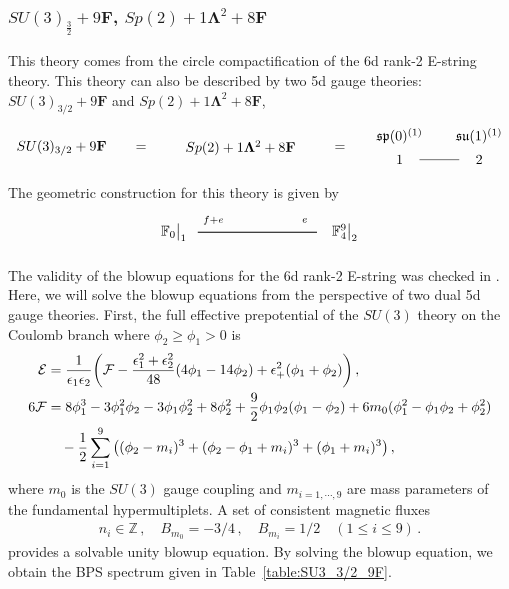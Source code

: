 \subsubsection{\texorpdfstring{$SU(3)_{\frac32}+9\mathbf{F}$,  $Sp(2)+1\mathbf{\Lambda}^2+8\mathbf{F}$}{SU(3)3/2 + 9F}}

This theory comes from the circle compactification of the 6d rank-2 E-string theory. This theory can also be described by two 5d gauge theories: $ SU(3)_{3/2} + 9\mathbf{F} $ and $ Sp(2) + 1\mathbf{\Lambda}^2 + 8\mathbf{F} $,
\begin{align}
\begin{tikzpicture}
\draw (0, 0) node {$ SU(3)_{3/2} + 9\mathbf{F} $}
(2, 0) node {$ = $}
(4.5, 0) node {$ Sp(2) + 1\mathbf{\Lambda}^2 + 8\mathbf{F} $}
(7, 0) node {$ = $}
(8.5, 0.3) node {$ \mathfrak{sp}(0)^{(1)} $}
(8.5, -0.3) node {$ 1 $}
(10.5, 0.3) node {$ \mathfrak{su}(1)^{(1)} $}
(10.5, -0.3) node {$ 2 $}
(9, -0.3) -- (10, -0.3)
;
\end{tikzpicture}
\end{align}
The geometric construction for this theory is given by
\begin{align}
\begin{tikzpicture}
\draw[thick](-3,0)--(0,0);	
\node at(-3.6,0) {$\mathbb{F}_{0}{}\big|_1$};
\node at(-2.6,0.3) {${}_{f+e}$};
\node at(0.7,0) {$\mathbb{F}_{4}^{9}{}\big|_2$};
\node at(-0.3,0.3) {${}_{e}$};
\end{tikzpicture}
\end{align}

The validity of the blowup equations for the 6d rank-2 E-string was checked in \cite{Gu:2019pqj}. Here, we will solve the blowup equations from the perspective of two dual 5d gauge theories. First, the full effective prepotential of the $ SU(3) $ theory on the Coulomb branch where $\phi_2\ge \phi_1>0$ is
\begin{align}
\mathcal{E} & = \frac{1}{\epsilon_1 \epsilon_2} \qty(\mathcal{F} - \frac{\epsilon_1^2 + \epsilon_2^2}{48} \qty(4\phi_1 - 14\phi_2 ) + \epsilon_+^2 (\phi_1 + \phi_2) ) \,, \nonumber \\
6\mathcal{F}
&= 8\phi_1^3 - 3\phi_1^2 \phi_2 - 3\phi_1 \phi_2^2 + 8\phi_2^2 + \frac{9}{2} \phi_1 \phi_2 (\phi_1 - \phi_2) + 6m_0 (\phi_1^2 - \phi_1 \phi_2 + \phi_2^2) \nonumber \\
& \quad - \frac{1}{2} \sum_{i=1}^9 \qty((\phi_2 - m_i)^3 + (\phi_2 - \phi_1 + m_i)^3 + (\phi_1 + m_i)^3) \, ,
\end{align}
where $ m_0 $ is the $SU(3)$ gauge coupling and $ m_{i=1, \cdots, 9} $ are mass parameters of the fundamental hypermultiplets. A set of consistent magnetic fluxes
\begin{align}
n_i \in \mathbb{Z} \, , \quad
B_{m_0} = -3/4 \, , \quad
B_{m_i} = 1/2 \quad (1 \leq i \leq 9) \, .
\end{align}
provides a solvable unity blowup equation. By solving the blowup equation, we obtain the BPS spectrum given in Table~\ref{table:SU3_3/2_9F}.

